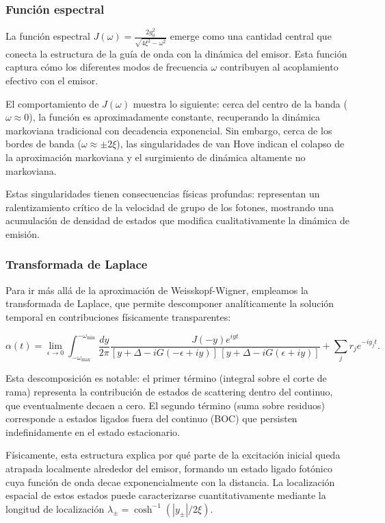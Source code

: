 \documentclass[onecolumn,notitlepage,letterpaper,aps,pra,12pt]{article}
\numberwithin{equation}{section}
\begin{document}
\subsubsection{Función espectral}

La función espectral $J(\omega) = \frac{2g_{0}^{2}}{\sqrt{4\xi^{2}-\omega^{2}}}$ emerge como una cantidad central que conecta la estructura de la guía de onda con la dinámica del emisor. Esta función captura cómo los diferentes modos de frecuencia $\omega$ contribuyen al acoplamiento efectivo con el emisor.

El comportamiento de $J(\omega)$ muestra lo siguiente: cerca del centro de la banda ($\omega \approx 0$), la función es aproximadamente constante, recuperando la dinámica markoviana tradicional con decadencia exponencial. Sin embargo, cerca de los bordes de banda ($\omega \approx \pm 2\xi$), las singularidades de van Hove indican el colapso de la aproximación markoviana y el surgimiento de dinámica altamente no markoviana.

Estas singularidades tienen consecuencias físicas profundas: representan un ralentizamiento crítico de la velocidad de grupo de los fotones, mostrando  una acumulación de densidad de estados que modifica cualitativamente la dinámica de emisión.

\subsubsection{Transformada de Laplace}

Para ir más allá de la aproximación de Weisskopf-Wigner, empleamos la transformada de Laplace, que permite descomponer analíticamente la solución temporal en contribuciones físicamente transparentes:

\[\alpha(t) = \lim_{\epsilon\to 0}\int_{-\omega_{\max}}^{-\omega_{\min}}\frac{dy}{2\pi}\frac{J(-y)e^{iyt}}{[y+\Delta-iG(-\epsilon+iy)]\,[y+\Delta-iG(\epsilon+iy)]} + \sum_{j}r_{j}e^{-iy_{j}t}.\]

Esta descomposición es notable: el primer término (integral sobre el corte de rama) representa la contribución de estados de scattering dentro del continuo, que eventualmente decaen a cero. El segundo término (suma sobre residuos) corresponde a estados ligados fuera del continuo (BOC) que persisten indefinidamente en el estado estacionario.

Físicamente, esta estructura explica por qué parte de la excitación inicial queda atrapada localmente alrededor del emisor, formando un estado ligado fotónico cuya función de onda decae exponencialmente con la distancia. La localización espacial de estos estados puede caracterizarse cuantitativamente mediante la longitud de localización $\lambda_{\pm} = \cosh^{-1} (|y_{\pm}|/2\xi)$.
\end{document}
